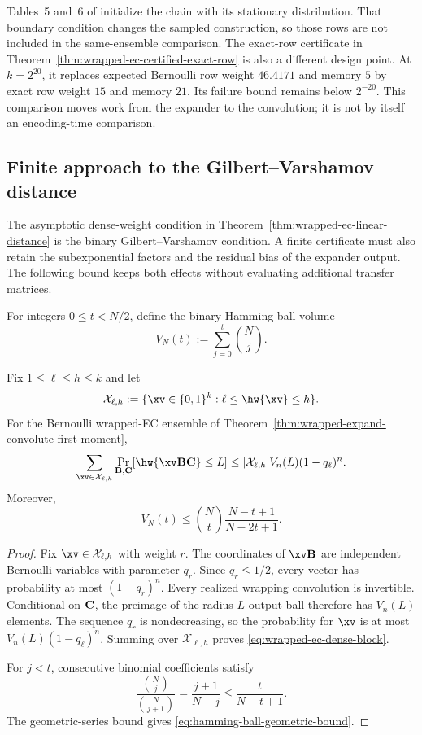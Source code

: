 Tables~5 and~6 of \cite{EC} initialize the chain with its stationary
distribution.  That boundary condition changes the sampled construction, so
those rows are not included in the same-ensemble comparison.  The exact-row
certificate in Theorem~\ref{thm:wrapped-ec-certified-exact-row} is also a
different design point.  At $k=2^{20}$, it replaces expected Bernoulli row
weight $46.4171$ and memory $5$ by exact row weight $15$ and memory $21$.
Its failure bound remains below $2^{-20}$.  This comparison moves work from
the expander to the convolution; it is not by itself an encoding-time
comparison.

\subsection{Finite approach to the Gilbert--Varshamov distance}
\label{sec:wrapped-ec-finite-gv}

The asymptotic dense-weight condition in
Theorem~\ref{thm:wrapped-ec-linear-distance} is the binary
Gilbert--Varshamov condition.  A finite certificate must also retain the
subexponential factors and the residual bias of the expander output.  The
following bound keeps both effects without evaluating additional transfer
matrices.

For integers $0\leq t<N/2$, define the binary Hamming-ball volume
\[
 V_N(t):=\sum_{j=0}^{t}\binom Nj.
\]

\begin{lemma}
\label{lem:wrapped-ec-dense-block}
Fix $1\leq\ell\leq h\leq k$ and let
\[
 \mathcal X_{\ell,h}
 :=\{\xv\in\{0,1\}^k:\ell\leq\hw{\xv}\leq h\}.
\]
For the Bernoulli wrapped-EC ensemble of
Theorem~\ref{thm:wrapped-expand-convolute-first-moment},
\begin{equation}
 \sum_{\xv\in\mathcal X_{\ell,h}}
 \Pr_{\B,\C}[\hw{\xv\B\C}\leq L]
 \leq
 |\mathcal X_{\ell,h}|V_n(L)(1-q_\ell)^n.
 \label{eq:wrapped-ec-dense-block}
\end{equation}
Moreover,
\begin{equation}
 V_N(t)
 \leq
 \binom Nt\frac{N-t+1}{N-2t+1}.
 \label{eq:hamming-ball-geometric-bound}
\end{equation}
\end{lemma}

\begin{proof}
Fix $\xv\in\mathcal X_{\ell,h}$ with weight $r$.  The coordinates of
$\xv\B$ are independent Bernoulli variables with parameter $q_r$.
Since $q_r\leq1/2$, every vector has probability at most $(1-q_r)^n$.
Every realized wrapping convolution is invertible.  Conditional on $\mathbf C$, the
preimage of the radius-$L$ output ball therefore has $V_n(L)$ elements.
The sequence $q_r$ is nondecreasing, so the probability for $\xv$ is at most
$V_n(L)(1-q_\ell)^n$.  Summing over $\mathcal X_{\ell,h}$ proves
\eqref{eq:wrapped-ec-dense-block}.

For $j<t$, consecutive binomial coefficients satisfy
\[
 \frac{\binom Nj}{\binom N{j+1}}
 =\frac{j+1}{N-j}
 \leq\frac{t}{N-t+1}.
\]
The geometric-series bound gives
\eqref{eq:hamming-ball-geometric-bound}.
\end{proof}

